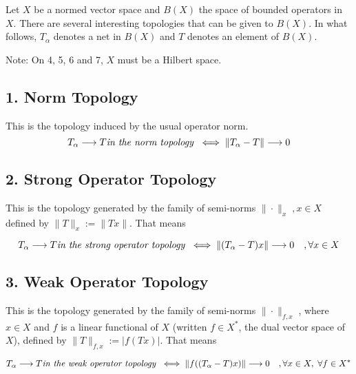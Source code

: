 \documentclass[12pt]{article}
\begin{document}

Let $X$ be a normed vector space and $B(X)$ the space of bounded operators in $X$.  There are several interesting topologies that can be given to $B(X)$.  In what follows, $T_{\alpha}$ denotes a net in $B(X)$ and $T$ denotes an element of $B(X)$.

Note: On 4, 5, 6 and 7, $X$ must be a Hilbert space.

\subsection{1. Norm Topology}
This is the topology induced by the usual operator norm.\\

\begin{displaymath}
 T_{\alpha} \longrightarrow T \text{\emph{in the norm topology}}\;\; \Longleftrightarrow \; \|T_{\alpha} - T \|
 \longrightarrow 0
\end{displaymath}

\subsection{2. Strong Operator Topology}
 This is the topology generated by the family of semi-norms $\|
 \cdot \|_{x}\;, x \in X$ defined by $\|T \|_{x} := \|Tx \|$. That means

\begin{displaymath}
T_{\alpha} \longrightarrow T \text{\emph{in the strong operator topology}}\;\; \Longleftrightarrow\; \|(T_{\alpha}-
 T )x\| \longrightarrow 0 \quad, \forall x \in X
\end{displaymath}

\subsection{3. Weak Operator Topology}
 This is the topology generated by the family of semi-norms
 $\| \cdot \|_{f,x}\;$, where $x \in X$ and $f$ is a linear functional of $X$ (written $f\in X^*$, the dual vector space  of $X$), defined by $\| T \|_{f,x} := |f(Tx)|$. That means

\begin{displaymath}
T_{\alpha} \longrightarrow T \text{\emph{in the weak operator topology}}\;\; \Longleftrightarrow\; \|f((T_{\alpha} -T)x) \| \longrightarrow 0 \quad, \forall x \in X ,\; \forall f\in X^*
\end{displaymath}

$\,$
\end{document}
